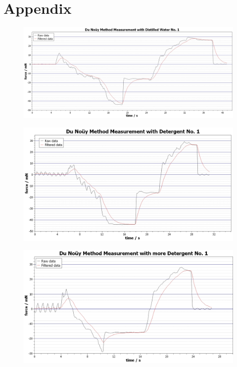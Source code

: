 \chapter{Appendix}
    \begin{figure}[h]
        \centering
        \includegraphics[width=.9\textwidth]{scidavis/Du_Nouy_Method_Measurement_with_distilled_water_No_1.jpg}
        \caption[]{}
        \label{fig:Du_Nouy_Method_Measurement_with_distilled_water_No_1}
    \end{figure}
    \begin{figure}[h]
        \centering
        \includegraphics[width=.9\textwidth]{scidavis/Du_Nouy_Method_Measurement_with_detergent_No_1.jpg}
        \caption[]{}
        \label{fig:Du_Nouy_Method_Measurement_with_detergent_No_1}
    \end{figure}
    \begin{figure}[h]
        \centering
        \includegraphics[width=.9\textwidth]{scidavis/Du_Nouy_Method_Measurement_with_more_detergent_No_1.jpg}
        \caption[]{}
        \label{fig:Du_Nouy_Method_Measurement_with_more_detergent_No_1}
    \end{figure}
